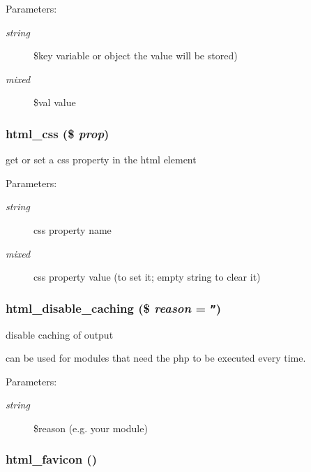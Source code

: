 \begin{Desc}
\item[Parameters:]
\begin{description}
\item[{\em string}]\$key variable or object the value will be stored) \item[{\em mixed}]\$val value \end{description}
\end{Desc}
\hypertarget{html_8inc_8php_d52276fa2a03df7342ba4b8e6a334ce0}{
\subsubsection[{html\_\-css}]{\setlength{\rightskip}{0pt plus 5cm}html\_\-css (\$ {\em prop})}}
\label{html_8inc_8php_d52276fa2a03df7342ba4b8e6a334ce0}


get or set a css property in the html element

\begin{Desc}
\item[Parameters:]
\begin{description}
\item[{\em string}]css property name \item[{\em mixed}]css property value (to set it; empty string to clear it) \end{description}
\end{Desc}
\hypertarget{html_8inc_8php_b0dafe79ee61164014b0a4d8b4112dbb}{
\subsubsection[{html\_\-disable\_\-caching}]{\setlength{\rightskip}{0pt plus 5cm}html\_\-disable\_\-caching (\$ {\em reason} = {\tt ''})}}
\label{html_8inc_8php_b0dafe79ee61164014b0a4d8b4112dbb}


disable caching of output

can be used for modules that need the php to be executed every time. \begin{Desc}
\item[Parameters:]
\begin{description}
\item[{\em string}]\$reason (e.g. your module) \end{description}
\end{Desc}
\hypertarget{html_8inc_8php_5738adf9b56d1ff2b8d02977ed7929ce}{
\subsubsection[{html\_\-favicon}]{\setlength{\rightskip}{0pt plus 5cm}html\_\-favicon ()}}
\label{html_8inc_8php_5738adf9b56d1ff2b8d02977ed7929ce}


